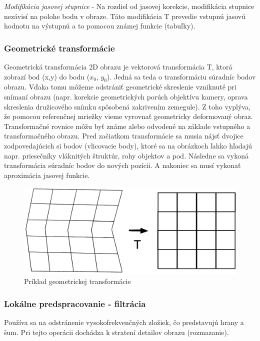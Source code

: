 \textit{Modifikácia jasovej stupnice} - Na rozdiel od jasovej korekcie, modifikácia stupnice nezávisí na polohe bodu v obraze. Táto modifikácia T prevedie vstupnú jasovú hodnotu na výstupnú a to pomocou známej funkcie (tabuľky). 


\subsubsection{Geometrické transformácie}
Geometrická transformácia 2D obrazu je vektorová transformácia T, ktorá zobrazí bod (x,y) do bodu ($x_0$, $y_0$).  Jedná sa teda o transformáciu súradníc bodov obrazu. Vďaka tomu môžeme odstrániť geometrické skreslenie vzniknuté pri snímaní obrazu (napr. korekcie geometrických porúch objektívu kamery, oprava skreslenia družicového snímku spôsobená zakrivením zemegule).  Z toho vyplýva, že pomocou referenčnej mriežky vieme vyrovnať geometricky deformovaný obraz. Transformačné rovnice môžu byť známe alebo odvodené na základe vstupného a transformačného  obrazu. Pred začiatkom transformácie sa musia nájsť dvojice zodpovedajúcich si bodov (vlicovacie body), ktoré sa na obrázkoch ľahko hľadajú napr. priesečníky vláknitých štruktúr, rohy objektov a pod. Následne sa vykoná transformácia súradníc bodov do nových pozícii. A nakoniec sa musí vykonať aproximácia jasovej funkcie.

\begin{figure}[H]
\begin{center}
	\includegraphics[scale=0.4]{obrazky/geometrickaTransformacia}
	\caption{Príklad geometrickej transformácie}
	\end{center}
\end{figure}

\subsubsection{Lokálne predspracovanie - filtrácia}
Používa sa na odstránenie vysokofrekvenčných zložiek, čo predstavujú hrany a šum. Pri tejto operácii dochádza k stratení detailov obrazu (rozmazanie).

